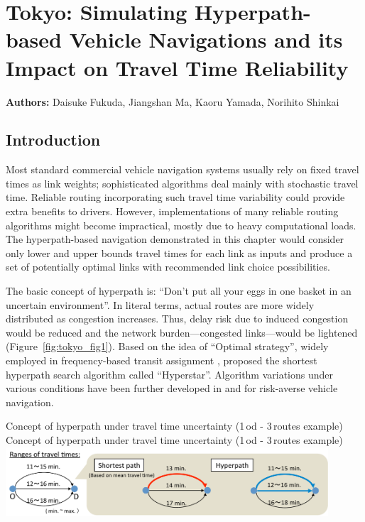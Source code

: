 \chapter{Tokyo: Simulating Hyperpath-based Vehicle Navigations and its Impact on Travel Time Reliability}
\label{ch:tokyo}
\hfill \textbf{Authors:} Daisuke Fukuda, Jiangshan Ma, Kaoru Yamada, Norihito Shinkai

\section{Introduction}

Most standard commercial vehicle navigation systems usually rely on fixed travel times as link weights; sophisticated algorithms deal mainly with stochastic travel time. Reliable routing incorporating such travel time variability could provide extra benefits to drivers. However, implementations of many reliable routing algorithms might become impractical, mostly due to heavy computational loads. The hyperpath-based navigation demonstrated in this chapter would consider only lower and upper bounds travel times for each link as inputs and produce a set of potentially optimal links with recommended link choice possibilities.  

The basic concept of hyperpath is:  ``Don't put all your eggs in one basket in an uncertain environment''. In literal terms, actual routes are more widely distributed as congestion increases. Thus, delay risk due to induced congestion would be reduced and the network burden---congested links---would be lightened (Figure~\ref{fig:tokyo_fig1}). Based on the idea of ``Optimal strategy'', widely employed in frequency-based transit assignment \citep[see][]{Spiess1989}, \citet{Bell2009} proposed the shortest hyperpath search algorithm called ``Hyperstar''.  Algorithm variations under various conditions have been further developed in \citet{Bell2012} and \citet{Ma2013} for risk-averse vehicle navigation.

\createfigure%
{Concept of hyperpath under travel time uncertainty (1\,\gls{od} - 3\,routes example)}%
{Concept of hyperpath under travel time uncertainty (1\,\gls{od} - 3\,routes example)}%
{\label{fig:tokyo_fig1}}%
{\includegraphics[width=0.90\textwidth, angle=0]{./scenarios/figures/tokyo_fig1.pdf}}%
{}

